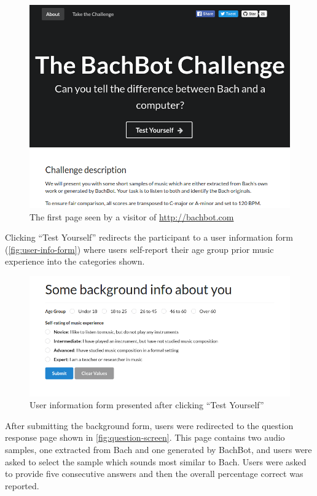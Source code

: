 \documentclass[dissertation.tex]{subfiles}
\begin{document}
\begin{figure}[htpb]
  \centering
  \includegraphics[width=1.0\linewidth]{Figures/bachbot-front-page.png}
  \caption{The first page seen by a visitor of \url{http://bachbot.com}}
  \label{fig:bachbot-front-page}
\end{figure}

Clicking ``Test Yourself'' redirects the participant to a user information form
(\autoref{fig:user-info-form}) where users self-report their age
group prior music experience into the categories shown.

\begin{figure}[htpb]
  \centering
  \includegraphics[width=1.0\linewidth]{Figures/user-info-form.png}
  \caption{User information form presented after clicking ``Test Yourself''}
  \label{fig:user-info-form}
\end{figure}

After submitting the background form, users were redirected to the question
response page shown in \autoref{fig:question-screen}. This page contains two
audio samples, one extracted from Bach and one generated by BachBot, and users
were asked to select the sample which sounds most similar to Bach. Users were
asked to provide five consecutive answers and then the overall percentage
correct was reported.
\end{document}
